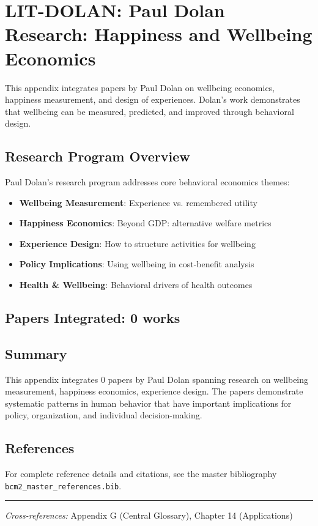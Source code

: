 \section{LIT-DOLAN: Paul Dolan Research: Happiness and Wellbeing Economics}
\label{app:litac}

This appendix integrates papers by Paul Dolan on wellbeing economics,
happiness measurement, and design of experiences. Dolan's work demonstrates that
wellbeing can be measured, predicted, and improved through behavioral design.

\subsection{Research Program Overview}

Paul Dolan's research program addresses core behavioral economics themes:

\begin{itemize}
  \item \textbf{Wellbeing Measurement}: Experience vs. remembered utility
  \item \textbf{Happiness Economics}: Beyond GDP: alternative welfare metrics
  \item \textbf{Experience Design}: How to structure activities for wellbeing
  \item \textbf{Policy Implications}: Using wellbeing in cost-benefit analysis
  \item \textbf{Health & Wellbeing}: Behavioral drivers of health outcomes
\end{itemize}

\subsection{Papers Integrated: 0 works}

\subsection{Summary}

This appendix integrates 0 papers by Paul Dolan
spanning research on wellbeing measurement, happiness economics, experience design.
The papers demonstrate systematic patterns in human behavior that have important
implications for policy, organization, and individual decision-making.

\subsection{References}

For complete reference details and citations, see the master bibliography
\texttt{bcm2\_master\_references.bib}.

\vspace{1em}
\hrule
\vspace{0.5em}

\noindent\textit{Cross-references:}
Appendix G (Central Glossary), Chapter 14 (Applications)
